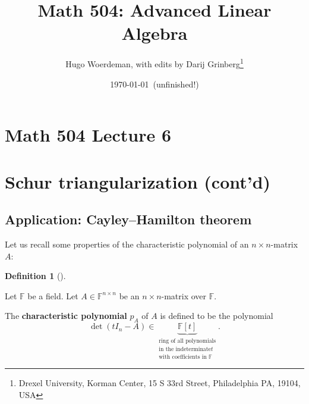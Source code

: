 \documentclass[numbers=enddot,12pt,final,onecolumn,notitlepage]{scrartcl}%
\numberwithin{exer}{subsection}
\theoremstyle{definition}
\newtheorem{defi}[theo]{Definition}
\newenvironment{definition}[1][]
{\begin{defi}[#1]\begin{leftbar}}
{\end{leftbar}\end{defi}}
\begin{document}
\title{Math 504: Advanced Linear Algebra}
\author{Hugo Woerdeman, with edits by Darij Grinberg\thanks{Drexel University, Korman
Center, 15 S 33rd Street, Philadelphia PA, 19104, USA}}
\date{\today\ (unfinished!)}
\maketitle
\tableofcontents

\section*{Math 504 Lecture 6}

\section{Schur triangularization (cont'd)}

\subsection{Application: Cayley--Hamilton theorem}

Let us recall some properties of the characteristic polynomial of an $n\times
n$-matrix $A$:

\begin{definition}
Let $\mathbb{F}$ be a field. Let $A\in\mathbb{F}^{n\times n}$ be an $n\times
n$-matrix over $\mathbb{F}$.

The \textbf{characteristic polynomial} $p_{A}$ of $A$ is defined to be the
polynomial%
\[
\det\left(  tI_{n}-A\right)  \in\underbrace{\mathbb{F}\left[  t\right]
}_{\substack{\text{ring of all polynomials}\\\text{in the indeterminate
}t\\\text{with coefficients in }\mathbb{F}}}.
\]

\end{definition}
\end{document}
